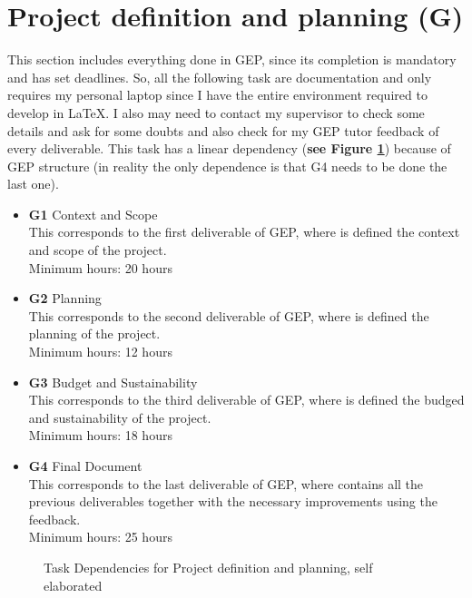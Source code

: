 \section{Project definition and planning \textbf{(G)} }
This section includes everything done in GEP, since its completion is mandatory and has set deadlines.
So, all the following task are documentation and only requires my personal laptop since I have the entire environment required to develop in \LaTeX.
I also may need to contact my supervisor to check some details and ask for some doubts and also check for my GEP tutor feedback of every deliverable.
This task has a linear dependency (\textbf{see Figure \ref{G_dependences}}) because of GEP structure (in reality the only dependence is that G4 needs to be done the last one).
\begin{itemize}
    \item \textbf{G1} Context and Scope \\
        This corresponds to the first deliverable of GEP, where is defined the context and scope of the project. \\
        Minimum hours: 20 hours
    \item \textbf{G2} Planning \\
        This corresponds to the second deliverable of GEP, where is defined the planning of the project. \\
        Minimum hours: 12 hours
    \item \textbf{G3} Budget and Sustainability \\
        This corresponds to the third deliverable of GEP, where is defined the budged and sustainability of the project. \\
        Minimum hours: 18 hours 
    \item \textbf{G4} Final Document \\
        This corresponds to the last deliverable of GEP, where contains all the previous deliverables together with the necessary improvements using the feedback. \\
        Minimum hours: 25 hours
\end{itemize}
\begin{figure}[h]
    \centering
    \caption{Task Dependencies for Project definition and planning, self elaborated}
    \label{G_dependences}
\end{figure}

